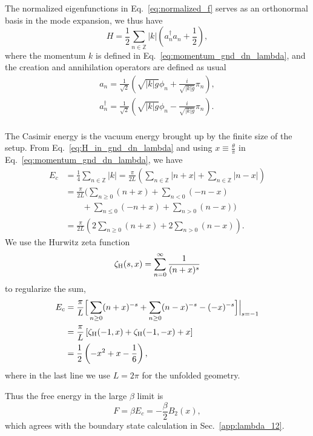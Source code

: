 The normalized eigenfunctions in Eq.~\eqref{eq:normalized_f} serves as an orthonormal basis in the mode expansion, we thus have
\begin{equation}
\label{eq:H_in_gnd_dn_lambda}
H = \frac{1}{2} \sum_{n \in \mathbb{Z} } |k|  \left(a^{\dagger}_n a_n + \frac{1}{2} \right) ,
\end{equation}
where the momentum $k$ is defined in Eq.~\eqref{eq:momentum_gnd_dn_lambda}, and the creation and annihilation operators are defined as usual
\begin{equation}
\begin{aligned}
a_n = \frac{1}{\sqrt{2}} \left( \sqrt{ |k|g} \phi_n + \frac{i }{\sqrt{|k|g} }\pi_n  \right) ,\\
a^{\dagger}_n = \frac{1}{\sqrt{2}} \left( \sqrt{ |k|g} \phi_n - \frac{i }{\sqrt{|k|g} }\pi_n  \right) .\\
\end{aligned}
\end{equation}

The Casimir energy is the vacuum energy brought up by the finite size of the setup. From Eq.~\eqref{eq:H_in_gnd_dn_lambda} and using $x\equiv \frac{\theta}{\pi}$ in Eq.~\eqref{eq:momentum_gnd_dn_lambda}, we have
\begin{equation}
\begin{aligned}
E_c &= \frac{1}{4} \sum_{n \in \mathbb{Z}} | k| = \frac{\pi}{2L} \left( \sum_{n \in \mathbb{Z}}  | n + x | + \sum_{n \in \mathbb{Z}}  | n - x |  \right) \\
&= \frac{\pi}{2L} \Bigg( \sum_{n\ge 0 }  ( n + x ) + \sum_{n< 0 }  ( -n - x )  \\
&\quad \quad + \sum_{n \le 0}  (- n + x ) + \sum_{n > 0} ( n- x )  \Bigg) \\
&= \frac{\pi}{2L} \left( 2\sum_{n\ge 0 }  ( n + x ) + 2\sum_{n > 0} ( n- x )  \right).
\end{aligned}
\end{equation}
We use the Hurwitz zeta function
\begin{equation}
\zeta_{\rm H}(s,x) = \sum_{n=0}^\infty\frac{1}{(n+x)^s}
\end{equation}
to regularize the sum, 
\begin{equation}
\begin{aligned}
E_c &= \frac{\pi}{L} \Big[\sum_{n \ge 0 } ( n + x )^{-s} + \sum_{n \ge 0 }  ( n - x)^{-s}  -  (-x)^{-s} \Big]\Big|_{s = -1} \\
&= \frac{\pi}{L} \left[ \zeta_{\rm H}( -1, x ) + \zeta_{\rm H}( -1, -x ) +  x \right] \\
&= \frac{1}{2} \left( - x^2 + x - \frac{1}{6}\right),
\end{aligned}
\end{equation}
where in the last line we use $L = 2\pi$ for the unfolded geometry. 

Thus the free energy in the large $\beta$ limit is
\begin{equation}
F = \beta E_c = - \frac{\beta}{2} B_2( x) ,
\end{equation}
which agrees with the boundary state calculation in Sec.~\ref{app:lambda_12}. 

